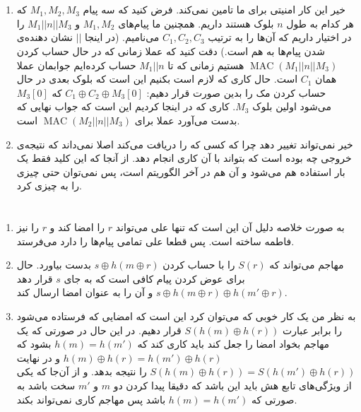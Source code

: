 \documentclass[]{article}
\begin{document}
\section{}
\begin{enumerate}
    \item خیر این کار امنیتی برای ما تامین نمی‌کند.
    فرض کنید که سه پیام
    $M_1, M_2, M_3$ که هر کدام به طول $n$ بلوک هستند داریم.
    همچنین ما
    پیام‌های
    $M_1, M_2$ و $M_1 || n || M_3$ را در اختیار داریم که آن‌ها را به ترتیب
    $C_1, C_2, C_3$ می‌نامیم.
    (در اینجا $||$ نشان دهنده‌ی  شدن پیام‌ها به هم است.)
    دقت کنید که عملا زمانی که در حال حساب کردن
    $\operatorname{MAC}(M_1 || n || M_3)$
    هستیم زمانی که تا
    $M_1 || n$
    حساب کرده‌ایم جوابمان عملا همان
    $C_1$
    است. حال کاری که لازم است بکنیم این است که بلوک بعدی در حال حساب کردن مک را بدین صورت قرار دهیم:
    $C_1 \oplus C_2 \oplus M_3[0]$ که $M_3[0]$
    می‌شود اولین بلوک
    $M_3$.
    کاری که در اینجا کردیم این است که جواب نهایی که
    بدست می‌آورد عملا برای
    $\operatorname{MAC}(M_2 || n || M_3)$
    است.

     
    \item خیر نمی‌تواند تغییر دهد چرا که کسی که
    را دریافت می‌کند اصلا نمی‌داند که نتیجه‌ی خروجی
    چه بوده است که بتواند با آن کاری انجام دهد. از آنجا که این کلید فقط یک بار استفاده هم می‌شود
    و آن هم در آخر الگوریتم است، پس نمی‌توان حتی چیزی را به چیزی
    کرد.
\end{enumerate}
\section{}
\begin{enumerate}
    \item به صورت خلاصه دلیل آن این است که تنها علی می‌تواند
    $r$
    را امضا کند و
    $r$
    را نیز فاطمه ساخته است. پس قطعا علی تمامی پیام‌ها را دارد می‌فرستد.
    \item مهاجم می‌تواند که
    $S(r)$
    را با حساب کردن
    $s \oplus h(m \oplus r)$
    بدست بیاورد. حال برای عوض کردن پیام کافی است که
    به جای
    $s$
    قرار دهد
    $s \oplus h(m \oplus r) \oplus h(m' \oplus r)$
    و آن را به عنوان امضا ارسال کند.
    \item به نظر من یک کار خوبی که می‌توان کرد این است که امضایی که فرستاده می‌شود را برابر عبارت
    $S(h(m) \oplus h(r))$
    قرار دهیم. در این حال در صورتی که یک مهاجم بخواد امضا را جعل کند باید کاری کند که
    $h(m) = h(m')$
    بشود که
    $h(m) \oplus h(r) = h(m') \oplus h(r)$ و در نهایت $S(h(m) \oplus h(r)) = S(h(m') \oplus h(r))$
    را نتیجه بدهد. و از آن‌جا که یکی از ویژگی‌های تابع هش باید این باشد که دقیقا پیدا کردن دو
    $m$ و $m'$
    سخت باشد به صورتی که
    $h(m) = h(m')$
    باشد پس مهاجم کاری نمی‌تواند بکند.
\end{enumerate}
\end{document}
